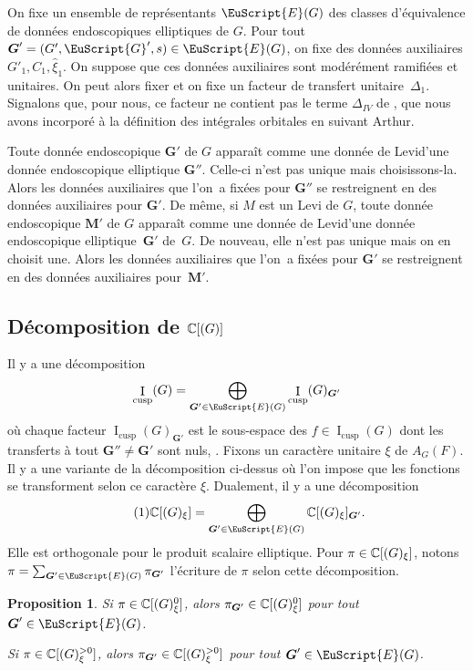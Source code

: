 \documentclass[JEP,XML,SOM,Unicode,francais]{cedram}
\let\mathcal \EuScript
\let\oldenumerate\enumerate
\renewcommand{\enumerate}{\oldenumerate\itemindent0pt}
\newenvironment{enumeratei}
{\bgroup\def\theenumi{\roman{enumi}}\def\theenumii{\arabic{enumii}}\oldenumerate}
{\endenumerate\egroup}
\newcommand{\NoChangel}[1]{%
\expandafter\let\csname old\string#1\endcsname=#1
\let#1=\relax
\newcommand{#1}{\mathcode`l="716C\csname old\string#1\endcsname\mathcode`l="7160 }%
}
\newcommand{\cusp}{\mathrm{cusp}}
\newcommand{\Ell}{\mathrm{Ell}} \NoChangel{\Ell}
\DeclareMathOperator{\rI}{I}
\newcommand{\bG}{\boldsymbol{G}}
\newcommand{\bM}{\boldsymbol{M}}
\newcommand{\cE}{\mathcal{E}}
\newcommand{\cG}{\mathcal{G}}
\newcommand{\CC}{\mathbb{C}}
\theoremstyle{plain}
\newtheorem*{prop*}{Proposition}
\theoremstyle{definition}
\begin{document}
On fixe un ensemble de représentants $\cE(G)$ des classes d'équivalence de données endoscopiques elliptiques de $G$.
Pour tout $\bG'=(G',\cG',s)\in \cE(G)$, on fixe des données auxiliaires $G'_{1},C_{1},\hat{\xi}_{1}$.
On suppose que ces données auxiliaires sont modérément ramifiées et unitaires. On peut alors fixer et on fixe un facteur de transfert unitaire~$\Delta_{1}$. Signalons que, pour nous, ce facteur ne contient pas le terme $\Delta_{\textit{IV}}$ de \cite{LS}, que nous avons incorporé à la définition des intégrales orbitales en suivant Arthur.

Toute donnée endoscopique $\bG'$ de $G$ apparaît comme une \og donnée de Levi\fg d'une donnée endoscopique elliptique $\bG''$. Celle-ci n'est pas unique mais choisissons-la. Alors les données auxiliaires que l'on~a fixées pour $\bG''$ se restreignent en des données auxiliaires pour $\bG'$. De même, si $M$ est un Levi de $G$, toute donnée endoscopique $\bM'$ de $G$ apparaît comme une \og donnée de Levi\fg d'une donnée endoscopique elliptique~$\bG'$ de~$G$. De nouveau, elle n'est pas unique mais on en choisit une. Alors les données auxiliaires que l'on~a fixées pour $\bG'$ se restreignent en des données auxiliaires pour~$\bM'$.

\subsection{Décomposition de \texorpdfstring{$\CC[\Ell(G)]$}{CLG}}\label{decomposition}

Il y a une décomposition
\[
\rI_{\cusp}(G)=\bigoplus_{\bG'\in\cE(G)}\rI_{\cusp}(G)_{\bG'}
\]
où chaque facteur $\rI_{\cusp}(G)_{\bG'}$ est le sous-espace des $f\in \rI_{\cusp}(G)$ dont les transferts à tout $\bG''\neq\bG'$ sont nuls, \cf \cite[Prop.\,I.4.11]{MW}. Fixons un caractère unitaire $\xi$ de $A_{G}(F)$. Il y a une variante de la décomposition ci-dessus où l'on impose que les fonctions se transforment selon ce caractère $\xi$. Dualement, il y a une décomposition
\begin{equation}\tag{1}\label{decomposition1}
\CC[\Ell(G)_{\xi}]=\bigoplus_{\bG'\in\cE(G)}\CC[\Ell(G)_{\xi}]_{\bG'}.
\end{equation}
Elle est orthogonale pour le produit scalaire elliptique. Pour $\pi\in \CC[\Ell(G)_{\xi}]$, notons $\pi=\sum_{\bG'\in \cE(G)}\pi_{\bG'}$ l'écriture de $\pi$ selon cette décomposition.

\skpt
\begin{prop*}
\begin{enumeratei}
\item\label{decompositioni}
Si $\pi\in \CC[\Ell(G)^0_{\xi}]$, alors $\pi_{\bG'}\in \CC[\Ell(G)^0_{\xi}]$ pour tout $\bG'\in \cE(G)$.

\item\label{decompositionii}
Si $\pi\in \CC[\Ell(G)^{>0}_{\xi}]$, alors $\pi_{\bG'}\in \CC[\Ell(G)^{>0}_{\xi}]$ pour tout $\bG'\in \cE(G)$.
\end{enumeratei}
\end{prop*}
\end{document}
